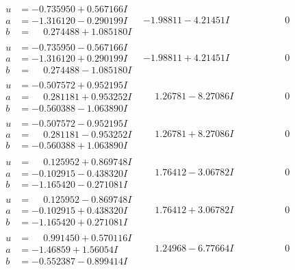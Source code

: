 \documentclass[1p]{elsarticle_modified}
\theoremstyle{definition}
\begin{document}
$$\begin{array}{c|c|c}
\begin{aligned}
u &= -0.735950 + 0.567166 I \\
a &= -1.316120 - 0.290199 I \\
b &= \phantom{-}0.274488 + 1.085180 I\end{aligned}
 & -1.98811 - 4.21451 I & \phantom{-0.000000 } 0 \\ \hline\begin{aligned}
u &= -0.735950 - 0.567166 I \\
a &= -1.316120 + 0.290199 I \\
b &= \phantom{-}0.274488 - 1.085180 I\end{aligned}
 & -1.98811 + 4.21451 I & \phantom{-0.000000 } 0 \\ \hline\begin{aligned}
u &= -0.507572 + 0.952195 I \\
a &= \phantom{-}0.281181 + 0.953252 I \\
b &= -0.560388 - 1.063890 I\end{aligned}
 & \phantom{-}1.26781 - 8.27086 I & \phantom{-0.000000 } 0 \\ \hline\begin{aligned}
u &= -0.507572 - 0.952195 I \\
a &= \phantom{-}0.281181 - 0.953252 I \\
b &= -0.560388 + 1.063890 I\end{aligned}
 & \phantom{-}1.26781 + 8.27086 I & \phantom{-0.000000 } 0 \\ \hline\begin{aligned}
u &= \phantom{-}0.125952 + 0.869748 I \\
a &= -0.102915 - 0.438320 I \\
b &= -1.165420 - 0.271081 I\end{aligned}
 & \phantom{-}1.76412 - 3.06782 I & \phantom{-0.000000 } 0 \\ \hline\begin{aligned}
u &= \phantom{-}0.125952 - 0.869748 I \\
a &= -0.102915 + 0.438320 I \\
b &= -1.165420 + 0.271081 I\end{aligned}
 & \phantom{-}1.76412 + 3.06782 I & \phantom{-0.000000 } 0 \\ \hline\begin{aligned}
u &= \phantom{-}0.991450 + 0.570116 I \\
a &= -1.46859 + 1.56054 I \\
b &= -0.552387 - 0.899414 I\end{aligned}
 & \phantom{-}1.24968 - 6.77664 I & \phantom{-0.000000 } 0 \\ \hline\begin{aligned}

\end{aligned}
\end{array}$$
\end{document}
